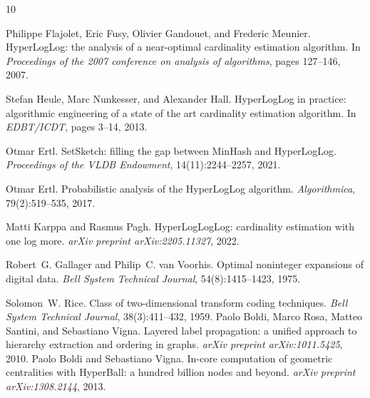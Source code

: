 \documentclass[11pt,letterpaper]{article}
\begin{document}
\begin{thebibliography}{10}

Philippe Flajolet, Eric Fusy, Olivier Gandouet, and Frederic Meunier.
\newblock HyperLogLog: the analysis of a near-optimal cardinality
  estimation algorithm.
\newblock In \emph{Proceedings of the 2007 conference on analysis of
  algorithms}, pages 127--146, 2007.

Stefan Heule, Marc Nunkesser, and Alexander Hall.
\newblock HyperLogLog in practice: algorithmic engineering of a state of the
  art cardinality estimation algorithm.
\newblock In \emph{EDBT/ICDT}, pages 3--14, 2013.


Otmar Ertl.
\newblock SetSketch: filling the gap between MinHash and HyperLogLog.
\newblock \emph{Proceedings of the VLDB Endowment}, 14(11):2244--2257,
  2021.

Otmar Ertl.
\newblock Probabilistic analysis of the HyperLogLog algorithm.
\newblock \emph{Algorithmica}, 79(2):519--535, 2017.

Matti Karppa and Rasmus Pagh.
\newblock HyperLogLogLog: cardinality estimation with one log more.
\newblock \emph{arXiv preprint arXiv:2205.11327}, 2022.

Robert~G. Gallager and Philip~C. van Voorhis.
\newblock Optimal noninteger expansions of digital data.
\newblock \emph{Bell System Technical Journal}, 54(8):1415--1423, 1975.

Solomon~W. Rice.
\newblock Class of two-dimensional transform coding techniques.
\newblock \emph{Bell System Technical Journal}, 38(3):411--432, 1959.
Paolo Boldi, Marco Rosa, Matteo Santini, and Sebastiano Vigna.
\newblock Layered label propagation: a unified approach to hierarchy
  extraction and ordering in graphs.
\newblock \emph{arXiv preprint arXiv:1011.5425}, 2010.
Paolo Boldi and Sebastiano Vigna.
\newblock In-core computation of geometric centralities with HyperBall:
  a hundred billion nodes and beyond.
\newblock \emph{arXiv preprint arXiv:1308.2144}, 2013.


\end{thebibliography}
\end{document}
